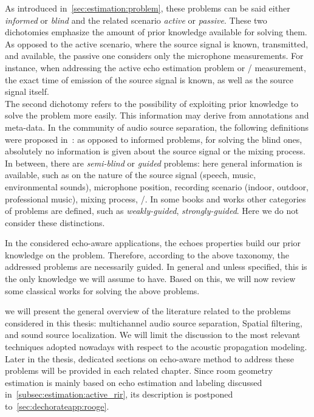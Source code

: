 \mynewline
As introduced in~\cref{sec:estimation:problem}, these problems can be said either \textit{informed} or \textit{blind} and the related scenario \textit{active} or \textit{passive}.
These two dichotomies emphasize the amount of prior knowledge available for solving them.
As opposed to the active scenario, where the source signal is known, transmitted, and available, the passive one considers only the microphone measurements.
For instance, when addressing the active echo estimation problem or \RIR/ measurement, the exact time of emission of the source signal is known, as well as the source signal itself.
\\The second dichotomy refers to the possibility of exploiting prior knowledge to solve the problem more easily.
This information may derive from annotations and meta-data.
In the community of audio source separation, the following definitions were proposed in~:
as opposed to informed problems, for solving the blind ones, absolutely no information is given about the source signal or the mixing process.
In between, there are \textit{semi-blind} or \textit{guided} problems:
here general information is available, such as on the nature of the source signal (speech, music, environmental sounds),
microphone position, recording scenario (indoor, outdoor, professional music), mixing process, \etc/.
In some books and works other categories of problems are defined, such as \emph{weakly-guided}, \emph{strongly-guided}.
Here we do not consider these distinctions.

\mynewline
In the considered echo-aware applications, the echoes properties build our prior knowledge on the problem.
Therefore, according to the above taxonomy, the addressed problems are necessarily guided.
In general and unless specified, this is the only knowledge we will assume to have.
Based on this, we will now review some classical works for solving the above problems.


 we will present the general overview of the literature related to the problems considered in this thesis: multichannel audio source separation, Spatial filtering, and sound source localization.
We will limit the discussion to the most relevant techniques adopted nowadays with respect to the acoustic propagation modeling.
Later in the thesis, dedicated sections on echo-aware method to address these problems will be provided in each related chapter.
Since room geometry estimation is mainly based on echo estimation and labeling discussed in~\cref{subsec:estimation:active_rir}, its description is postponed to~\cref{sec:dechorateapp:rooge}.


